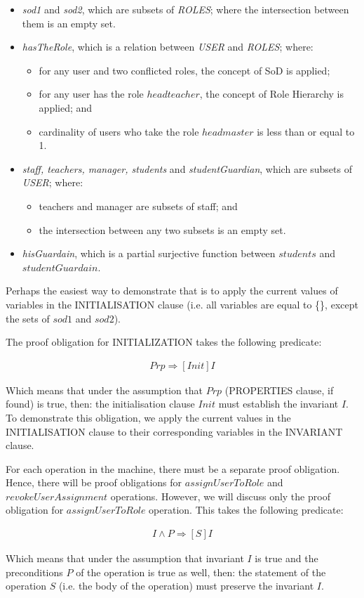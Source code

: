 \begin{itemize}
\item \emph{sod1} and \emph{sod2}, which are subsets of \emph{ROLES}; where the intersection between them is an empty set.
\item	\emph{hasTheRole}, which is a relation between \emph{USER} and \emph{ROLES}; where:
\begin{itemize}
\item for any user and two conflicted roles, the concept of SoD is applied;
\item for any user has the role $headteacher$, the concept of Role Hierarchy is applied; and
\item cardinality of users who take the role $headmaster$ is less than or equal to 1. 
\end{itemize}
\item	\emph{staff, teachers, manager, students} and \emph{studentGuardian}, which are subsets of \emph{USER}; where:
\begin{itemize}
\item	teachers and manager are subsets of staff; and
\item	the intersection between any two subsets is an empty set.
\end{itemize}
\item \emph{hisGuardain}, which is a partial surjective function between $students$ and $studentGuardain$.

\end{itemize}

Perhaps the easiest way to demonstrate that is to apply the current values of variables in the INITIALISATION clause (i.e. all variables are equal to \{\}, except the sets of $sod1$ and $sod2$).  

      
      The proof obligation for INITIALIZATION takes the following predicate: 

\begin{align*}
Prp \Rightarrow[Init] I
\end{align*}



Which means that under the assumption that $Prp$ (PROPERTIES clause, if found) is true, then: the initialisation clause $Init$ must establish the invariant $I$.  To demonstrate this obligation, we apply the current values in the INITIALISATION clause to their corresponding variables in the INVARIANT clause.

For each operation in the machine, there must be a separate proof obligation.  Hence, there will be proof obligations for $assignUserToRole$ and $revokeUserAssignment$ operations.  However, we will discuss only the proof obligation for $assignUserToRole$ operation.  This takes the following predicate: 

\begin{align*}
I \wedge P \Rightarrow [S] I
\end{align*}



Which means that under the assumption that invariant $I$ is true and the preconditions $P$ of the operation is true as well, then: the statement of the operation $S$ (i.e. the body of the operation) must preserve the invariant $I$.

